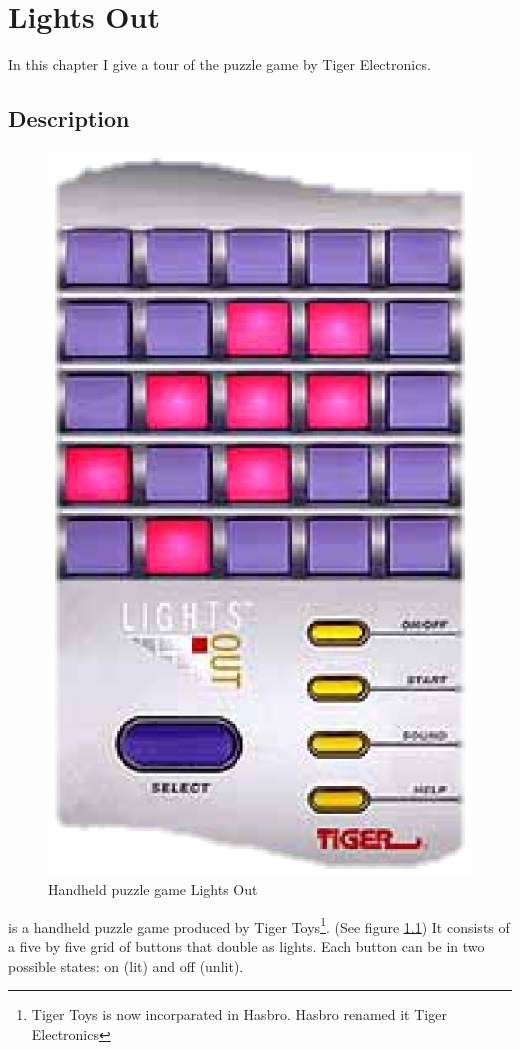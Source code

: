 \chapter{Lights Out}

In this chapter I give a tour of the puzzle game \lo by Tiger Electronics.

\section{Description}

\begin{figure}[bh]
	\begin{center}
		\includegraphics[width=\linewidth/3]{image/lightout.ps}
		\caption{Handheld puzzle game Lights Out}\label{figure:puzzle}
	\end{center}
\end{figure}
\lo is a handheld puzzle game produced by Tiger Toys\footnote{Tiger Toys is now
incorparated in Hasbro. Hasbro renamed it Tiger Electronics}. (See figure
\ref{figure:puzzle}) It consists of a five by five grid of buttons that double
as lights. Each button can be in two possible states: on (lit) and off (unlit).

